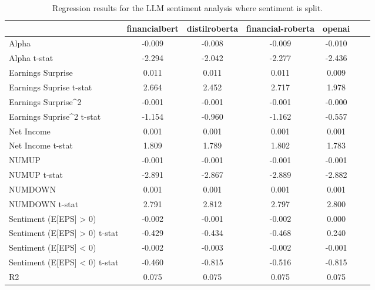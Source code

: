 \begin{table}
\caption{Regression results for the LLM sentiment analysis where sentiment is split.}
\label{tab:llm_regressions_split}
\begin{tabular}{lcccccc}
\toprule
 & financialbert & distilroberta & financial-roberta & openai \\
\midrule
Alpha & -0.009 & -0.008 & -0.009 & -0.010 \\
Alpha t-stat & -2.294 & -2.042 & -2.277 & -2.436 \\
Earnings Surprise & 0.011 & 0.011 & 0.011 & 0.009 \\
Earnings Suprise t-stat & 2.664 & 2.452 & 2.717 & 1.978 \\
Earnings Surprise^2 & -0.001 & -0.001 & -0.001 & -0.000 \\
Earnings Suprise^2 t-stat & -1.154 & -0.960 & -1.162 & -0.557 \\
Net Income & 0.001 & 0.001 & 0.001 & 0.001 \\
Net Income t-stat & 1.809 & 1.789 & 1.802 & 1.783 \\
NUMUP & -0.001 & -0.001 & -0.001 & -0.001 \\
NUMUP t-stat & -2.891 & -2.867 & -2.889 & -2.882 \\
NUMDOWN & 0.001 & 0.001 & 0.001 & 0.001 \\
NUMDOWN t-stat & 2.791 & 2.812 & 2.797 & 2.800 \\
Sentiment (E[EPS] > 0) & -0.002 & -0.001 & -0.002 & 0.000 \\
Sentiment (E[EPS] > 0) t-stat & -0.429 & -0.434 & -0.468 & 0.240 \\
Sentiment (E[EPS] < 0) & -0.002 & -0.003 & -0.002 & -0.001 \\
Sentiment (E[EPS] < 0) t-stat & -0.460 & -0.815 & -0.516 & -0.815 \\
R2 & 0.075 & 0.075 & 0.075 & 0.075 \\
\bottomrule
\end{tabular}
\end{table}
